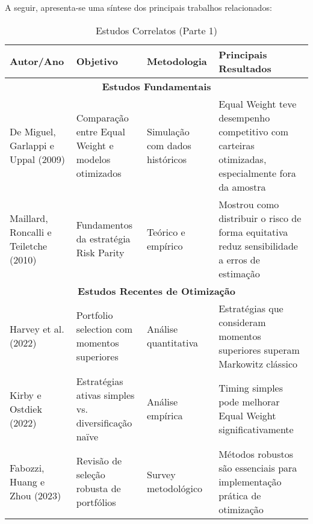 A seguir, apresenta-se uma síntese dos principais trabalhos relacionados:

\begin{table}[H]
\centering
\caption{Estudos Correlatos (Parte 1)}
\begin{tabular}{|p{2.3cm}|p{3.2cm}|p{2.6cm}|p{3.2cm}|}
\hline
\textbf{Autor/Ano} & \textbf{Objetivo} & \textbf{Metodologia} & \textbf{Principais Resultados} \\
\hline
\multicolumn{4}{|c|}{\textbf{Estudos Fundamentais}} \\
\hline
De Miguel, Garlappi e Uppal (2009) & Comparação entre Equal Weight e modelos otimizados & Simulação com dados históricos & Equal Weight teve desempenho competitivo com carteiras otimizadas, especialmente fora da amostra \\
\hline
Maillard, Roncalli e Teiletche (2010) & Fundamentos da estratégia Risk Parity & Teórico e empírico & Mostrou como distribuir o risco de forma equitativa reduz sensibilidade a erros de estimação \\
\hline
\multicolumn{4}{|c|}{\textbf{Estudos Recentes de Otimização}} \\
\hline
Harvey et al. (2022) & Portfolio selection com momentos superiores & Análise quantitativa & Estratégias que consideram momentos superiores superam Markowitz clássico \\
\hline
Kirby e Ostdiek (2022) & Estratégias ativas simples vs. diversificação naïve & Análise empírica & Timing simples pode melhorar Equal Weight significativamente \\
\hline
Fabozzi, Huang e Zhou (2023) & Revisão de seleção robusta de portfólios & Survey metodológico & Métodos robustos são essenciais para implementação prática de otimização \\
\hline
\end{tabular}
\label{tab:estudos_correlatos_1}
\end{table}

